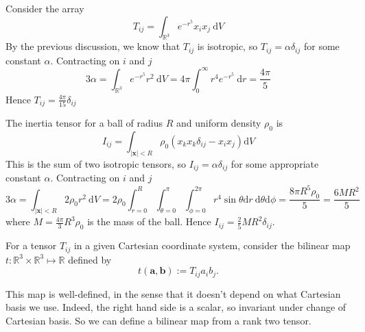 \begin{example}
    Consider the array
    \[
    T_{i j}=\int_{\mathbb{R}^{3}} e^{-r^{5}} x_{i} x_{j} \mathrm{~d} V
    \]
    By the previous discussion, we know that $T_{i j}$ is isotropic, so $T_{i j}=\alpha \delta_{i j}$ for some constant $\alpha$. Contracting on $i$ and $j$
    \[
    3 \alpha=\int_{\mathbb{R}^{3}} e^{-r^{5}} r^{2} \mathrm{~d} V=4 \pi \int_{0}^{\infty} r^{4} e^{-r^{5}} \mathrm{~d} r=\frac{4 \pi}{5}
    \]
    Hence $T_{i j}=\frac{4 \pi}{15} \delta_{i j}$
\end{example}
\begin{example}
    The inertia tensor for a ball of radius $R$ and uniform density $\rho_{0}$ is
    \[
    I_{i j}=\int_{|\mathbf{x}|<R} \rho_{0}\left(x_{k} x_{k} \delta_{i j}-x_{i} x_{j}\right) \mathrm{d} V
    \]
    This is the sum of two isotropic tensors, so $I_{i j}=\alpha \delta_{i j}$ for some appropriate constant $\alpha$. Contracting on $i$ and $j$
    \[
    3 \alpha=\int_{|\mathbf{x}|<R} 2 \rho_{0} r^{2} \mathrm{~d} V=2 \rho_{0} \int_{r=0}^{R} \int_{\theta=0}^{\pi} \int_{\phi=0}^{2 \pi} r^{4} \sin \theta \mathrm{d} r \mathrm{~d} \theta \mathrm{d} \phi=\frac{8 \pi R^{5} \rho_{0}}{5}=\frac{6 M R^{2}}{5}
    \]
    where $M=\frac{4 \pi}{3} R^{3} \rho_{0}$ is the mass of the ball. Hence $I_{i j}=\frac{2}{5} M R^{2} \delta_{i j}$.
\end{example}

For a tensor $T_{i j}$ in a given Cartesian coordinate system, consider the bilinear map $t: \mathbb{R}^{3} \times \mathbb{R}^{3} \mapsto \mathbb{R}$ defined by
\[
t(\mathbf{a}, \mathbf{b}):=T_{i j} a_{i} b_{j}.
\]

This map is well-defined, in the sense that it doesn't depend on what Cartesian basis we use. Indeed, the right hand side is a scalar, so invariant under change of Cartesian basis. So we can define a bilinear map from a rank two tensor.


